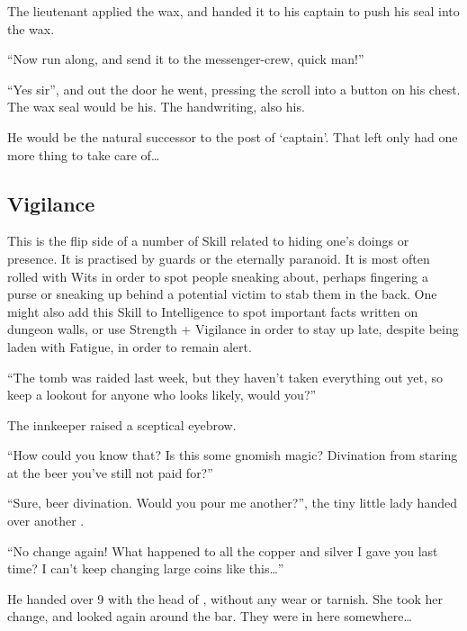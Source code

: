 \begin{multicols}{2}
\begin{exampletext}
  The lieutenant applied the wax, and handed it to his captain to push his seal into the wax.

  ``Now run along, and send it to the messenger-crew, quick man!''

  ``Yes sir'', and out the door he went, pressing the scroll into a button on his chest.
  The wax seal would be his.
  The handwriting, also his.

  He would be the natural successor to the post of `captain'.
  That left only had one more thing to take care of\ldots
  
\end{exampletext}

\subsection{Vigilance}

This is the flip side of a number of Skill related to hiding one's doings or presence.
It is practised by guards or the eternally paranoid.
It is most often rolled with Wits in order to spot people sneaking about, perhaps fingering a purse or sneaking up behind a potential victim to stab them in the back.
One might also add this Skill to Intelligence to spot important facts written on dungeon walls, or use Strength + Vigilance in order to stay up late, despite being laden with Fatigue, in order to remain alert.

\begin{exampletext}
  ``The tomb was raided last week, but they haven't taken everything out yet, so keep a lookout for anyone who looks likely, would you?''

  The innkeeper raised a sceptical eyebrow.

  ``How could you know that?
  Is this some gnomish magic?
  Divination from staring at the beer you've still not paid for?''

  ``Sure, beer divination.
  Would you pour me another?'', the tiny little lady handed over another .

  ``No change again!
  What happened to all the copper and silver I gave you last time?
  I can't keep changing large coins like this\ldots''

  He handed over 9  with the head of \iftoggle{aif}{Dalius Rex}{an ancient king}, without any wear or tarnish.
  She took her change, and looked again around the bar.
  They were in here somewhere\ldots
\end{exampletext}


\end{multicols}
